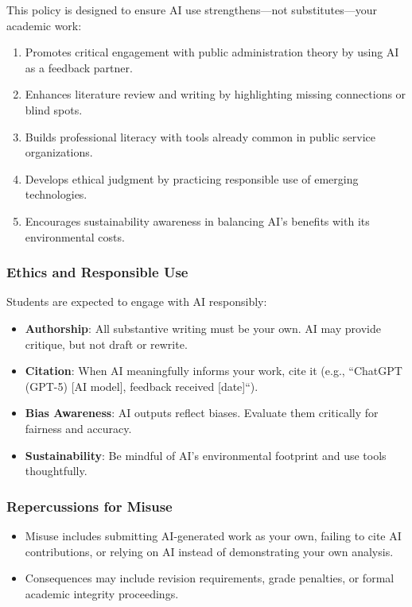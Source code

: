 \documentclass[12pt]{article}     %
\begin{document}
	This policy is designed to ensure AI use strengthens—not substitutes—your academic work:
	
	\begin{enumerate}
	    \item Promotes critical engagement with public administration theory by using AI as a feedback partner.
	    \item Enhances literature review and writing by highlighting missing connections or blind spots.
	    \item Builds professional literacy with tools already common in public service organizations.
	    \item Develops ethical judgment by practicing responsible use of emerging technologies.
	    \item Encourages sustainability awareness in balancing AI's benefits with its environmental costs.
	\end{enumerate}
	
	\subsubsection*{Ethics and Responsible Use}
	
	\noindent Students are expected to engage with AI responsibly:
	
	\begin{itemize}
	    \item \textbf{Authorship}: All substantive writing must be your own. AI may provide critique, but not draft or rewrite.
	    \item \textbf{Citation}: When AI meaningfully informs your work, cite it (e.g., ``ChatGPT (GPT-5) [AI model], feedback received [date]``).
	    \item \textbf{Bias Awareness}: AI outputs reflect biases. Evaluate them critically for fairness and accuracy.
	    \item \textbf{Sustainability}: Be mindful of AI's environmental footprint and use tools thoughtfully.
	\end{itemize}
	
	\subsubsection*{Repercussions for Misuse}
	
	\begin{itemize}
	    \item Misuse includes submitting AI-generated work as your own, failing to cite AI contributions, or relying on AI instead of demonstrating your own analysis.
	    \item Consequences may include revision requirements, grade penalties, or formal academic integrity proceedings.
	\end{itemize}
	
\end{document}
